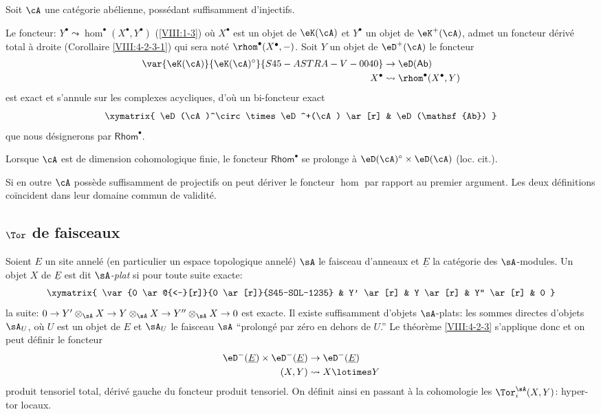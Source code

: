 Soit $\cA$ une catégorie abélienne, possédant suffisamment d'injectifs. 

Le foncteur: $Y^\bullet\leadsto \hom^\bullet(X^\bullet,Y^\bullet)$ (\ref{VIII:1-3}) 
où $X^\bullet$ est un objet de $\eK(\cA)$ et $Y^\bullet$ un objet de 
$\eK^+(\cA)$, admet un foncteur dérivé total à droite 
(Corollaire \ref{VIII:4-2-3-1}) qui sera noté $\rhom^\bullet(X^\bullet,-)$.  
Soit $Y$ un objet de $\eD^+(\cA)$ le foncteur 
\begin{align*}
  \var{\eK(\cA)}{\eK(\cA)^\circ}{S45-ASTRA-V-0040} &\to \eD(\mathsf{Ab}) \\
  X^\bullet &\leadsto \rhom^\bullet(X^\bullet,Y) 
\end{align*}
est exact et s'annule sur les complexes acycliques, d'où un bi-foncteur 
exact 
\[\xymatrix{
  \eD(\cA)^\circ \times \eD^+(\cA) \ar[r] 
    & \eD(\mathsf{Ab}) 
}\]
que nous désignerons par $\mathsf{Rhom}^\bullet$. 

Lorsque $\cA$ est de dimension cohomologique finie, le foncteur 
$\mathsf{Rhom}^\bullet$ se prolonge à $\eD(\cA)^\circ\times \eD(\cA)$ 
(loc. cit.). 

Si en outre $\cA$ possède suffisamment de projectifs on peut dériver le 
foncteur $\hom$ par rapport au premier argument. Les deux définitions 
co\"incident dans leur domaine commun de validité. 










\subsection{\texorpdfstring{$\Tor$}{Tor} de faisceaux}\label{VIII:6-2}

Soient $E$ un site annelé (en particulier un espace topologique annelé) 
$\sA$ le faisceau d'anneaux et $\underline E$ la catégorie des 
$\sA$-modules. Un objet $X$ de $\underline E$ est dit 
\emph{$\sA$-plat} si pour toute suite exacte: 
\[\xymatrix{
  \var{0 \ar@{<-}[r]}{0 \ar[r]}{S45-SOL-1235} 
    & Y' \ar[r] 
    & Y \ar[r] 
    & Y'' \ar[r] 
    & 0 
}\]
la suite: $0 \to Y'\otimes_\sA X \to Y\otimes_\sA X \to Y''\otimes_\sA X\to 0$ 
est exacte. Il existe suffisamment d'objets $\sA$-plats: les sommes directes 
d'objets $\sA_U$, où $U$ est un objet de $E$ et $\sA_U$ le faisceau 
$\sA$ ``prolongé par zéro en dehors de $U$.'' Le théorème 
\ref{VIII:4-2-3} s'applique donc et on peut définir le foncteur 
\begin{align*}
  \eD^-(\underline E) \times \eD^-(\underline E) &\to \eD^-(\underline E) \\
  (X,Y) &\leadsto X\lotimes Y 
\end{align*}
produit tensoriel total, dérivé gauche du foncteur produit tensoriel. 
On définit ainsi en passant à la cohomologie les $\Tor_i^\sA(X,Y)$: 
hyper-tor locaux. 

